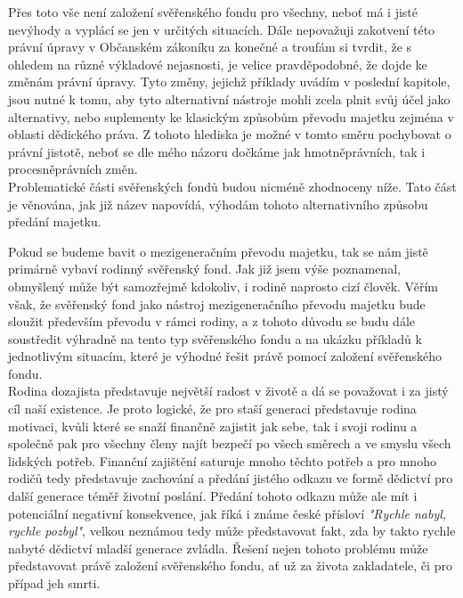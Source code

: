 \documentclass{article}
\begin{document}
Přes toto vše není založení svěřenského fondu pro všechny, neboť má i jisté nevýhody a vyplácí se jen v určitých situacích. Dále nepovažuji zakotvení této právní úpravy v Občanském zákoníku za konečné a troufám si tvrdit, že s ohledem na různé výkladové nejasnosti, je velice pravděpodobné, že dojde ke změnám právní úpravy. Tyto změny, jejichž příklady uvádím v poslední kapitole, jsou nutné k tomu, aby tyto alternativní nástroje mohli zcela plnit svůj účel jako alternativy, nebo suplementy ke klasickým způsobům převodu majetku zejména v oblasti dědického práva. Z tohoto hlediska je možné v tomto směru pochybovat o právní jistotě, neboť se dle mého názoru dočkáme jak hmotněprávních, tak i procesněprávních změn.\\

 Problematické části svěřenských fondů budou nicméně zhodnoceny níže. Tato část je věnována, jak již název napovídá, výhodám tohoto alternativního způsobu předání majetku. 
 
 Pokud se budeme bavit o mezigeneračním převodu majetku, tak se nám jistě primárně vybaví rodinný svěřenský fond. Jak již jsem výše poznamenal, obmyšlený může být samozřejmě kdokoliv, i rodině naprosto cizí člověk. Věřím však, že svěřenský fond jako nástroj mezigeneračního převodu majetku bude sloužit především převodu v rámci rodiny, a z tohoto důvodu se budu dále soustředit výhradně na tento typ svěřenského fondu a na ukázku příkladů k jednotlivým situacím, které je výhodné řešit právě pomocí založení svěřenského fondu.\\
 
 
 Rodina dozajista představuje největší radost v životě a dá se považovat i za jistý cíl naší existence. Je proto logické, že pro staší generaci představuje rodina motivaci, kvůli které se snaží finančně zajistit jak sebe, tak i svoji rodinu a společně pak pro všechny členy najít bezpečí po všech směrech a ve smyslu všech lidských potřeb. Finanční zajištění saturuje mnoho těchto potřeb a pro mnoho rodičů tedy představuje zachování a předání jistého odkazu ve formě dědictví pro další generace téměř životní poslání. Předání tohoto odkazu může ale mít i potenciální negativní konsekvence, jak říká i známe české přísloví \textit{"Rychle nabyl, rychle pozbyl"}, velkou neznámou tedy může představovat fakt, zda by takto rychle nabyté dědictví mladší generace zvládla. Řešení nejen tohoto problému může představovat právě založení svěřenského fondu, ať už za života zakladatele, či pro případ jeh smrti.\\
 
\end{document}
